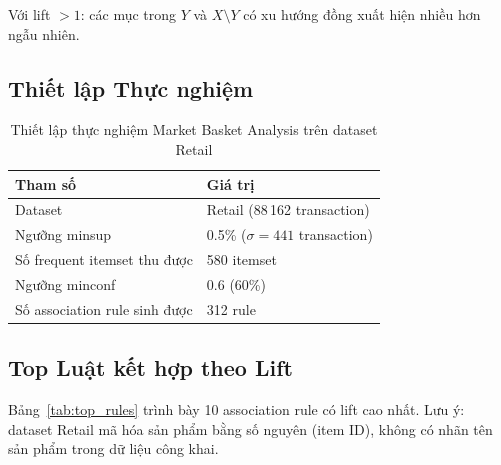 \documentclass[12pt,a4paper]{article}
\theoremstyle{definition}
\begin{document}
Với lift $> 1$: các mục trong $Y$ và $X \setminus Y$ có xu hướng đồng xuất hiện nhiều hơn ngẫu nhiên.

\subsection{Thiết lập Thực nghiệm}

\begin{table}[H]
\centering
\begin{tabular}{l l}
    \toprule
    \textbf{Tham số} & \textbf{Giá trị} \\
    \midrule
    Dataset               & Retail (88\,162 transaction) \\
    Ngưỡng minsup         & 0.5\% ($\sigma = 441$ transaction) \\
    Số frequent itemset thu được & 580 itemset \\
    Ngưỡng minconf        & 0.6 (60\%) \\
    Số association rule sinh được & 312 rule \\
    \bottomrule
\end{tabular}
\caption{Thiết lập thực nghiệm Market Basket Analysis trên dataset Retail}
\label{tab:mba_setup}
\end{table}

\subsection{Top Luật kết hợp theo Lift}

Bảng~\ref{tab:top_rules} trình bày 10 association rule có \gls{lift} cao nhất. Lưu ý: dataset Retail mã hóa sản phẩm bằng số nguyên (item ID), không có nhãn tên sản phẩm trong dữ liệu công khai.
\end{document}
